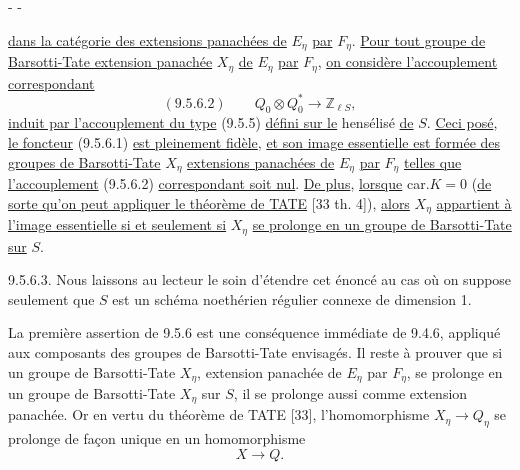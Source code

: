 \begin{center}-  -\end{center}

\uline{dans la catégorie des extensions panachées de} $E_\eta$ \uline{par} $F_\eta$. \uline{Pour tout groupe de Barsotti-Tate extension panachée} $X_\eta$ \uline{de} $E_\eta$ \uline{par} $F_\eta$, \uline{on considère l'accouplement correspondant}
\[
(9.5.6.2)\qquad Q_0\otimes Q_0^*\longrightarrow\mathbb Z_{\ell S},
\]
\uline{induit par l'accouplement du type} (9.5.5) \uline{défini sur le} hensélisé \uline{de} $S$. \uline{Ceci posé}, \uline{le foncteur} (9.5.6.1) \uline{est pleinement fidèle}, \uline{et son image essentielle est formée des groupes de Barsotti-Tate} $X_\eta$ \uline{extensions panachées de} $E_\eta$ \uline{par} $F_\eta$ \uline{telles que l'accouplement} (9.5.6.2) \uline{correspondant soit nul}. \uline{De plus}, \uline{lorsque} car.$K=0$ (\uline{de sorte qu'on peut appliquer le théorème de TATE} [33 th. 4]), \uline{alors} $X_\eta$ \uline{appartient à l'image essentielle si et seulement si} $X_\eta$ \uline{se prolonge en un groupe de Barsotti-Tate sur} $S$.

9.5.6.3. Nous laissons au lecteur le soin d'étendre cet énoncé au cas où on suppose seulement que $S$ est un schéma noethérien régulier connexe de dimension 1.

La première assertion de 9.5.6 est une conséquence immédiate de 9.4.6, appliqué aux composants des groupes de Barsotti-Tate envisagés. Il reste à prouver que si un groupe de Barsotti-Tate $X_\eta$, extension panachée de $E_\eta$ par $F_\eta$, se prolonge en un groupe de Barsotti-Tate $X_\eta$ sur $S$, il se prolonge aussi comme extension panachée. Or en vertu du théorème de TATE [33], l'homomorphisme $X_\eta\longrightarrow Q_\eta$ se prolonge de façon unique en un homomorphisme
\[
 X\longrightarrow Q.
\]

